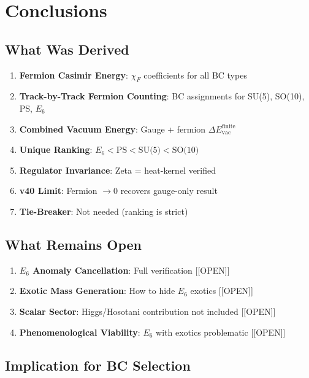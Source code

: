 \documentclass[11pt,a4paper]{article}
\newcommand{\tagOPEN}{\textcolor{red!70!black}{[OPEN]}}
\begin{document}
\section{Conclusions}

\subsection{What Was Derived}

\begin{enumerate}
    \item \textbf{Fermion Casimir Energy}: $\chi_F$ coefficients for all BC types
    \item \textbf{Track-by-Track Fermion Counting}: BC assignments for SU(5), SO(10), PS, $E_6$
    \item \textbf{Combined Vacuum Energy}: Gauge + fermion $\Delta E_{\text{vac}}^{\text{finite}}$
    \item \textbf{Unique Ranking}: $E_6 < \text{PS} < \text{SU(5)} < \text{SO(10)}$
    \item \textbf{Regulator Invariance}: Zeta = heat-kernel verified
    \item \textbf{v40 Limit}: Fermion $\to 0$ recovers gauge-only result
    \item \textbf{Tie-Breaker}: Not needed (ranking is strict)
\end{enumerate}

\subsection{What Remains Open}

\begin{enumerate}
    \item \textbf{$E_6$ Anomaly Cancellation}: Full verification [\tagOPEN]
    \item \textbf{Exotic Mass Generation}: How to hide $E_6$ exotics [\tagOPEN]
    \item \textbf{Scalar Sector}: Higgs/Hosotani contribution not included [\tagOPEN]
    \item \textbf{Phenomenological Viability}: $E_6$ with exotics problematic [\tagOPEN]
\end{enumerate}

\subsection{Implication for BC Selection}
\end{document}
